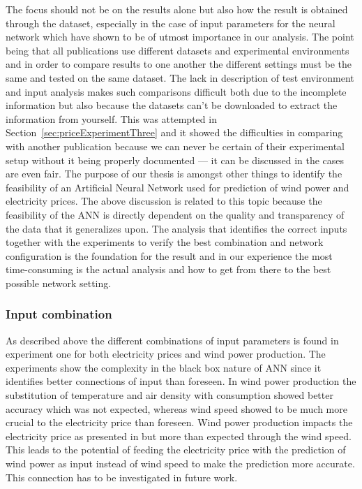 The focus should not be on the results alone but also how the result is obtained through the dataset, especially in the case of input parameters for the neural network which have shown to be of utmost importance in our analysis. The point being that all publications use different datasets and experimental environments and in order to compare results to one another the different settings must be the same and tested on the same dataset. The lack in description of test environment and input analysis makes such comparisons difficult both due to the incomplete information but also because the datasets can't be downloaded to extract the information from yourself. This was attempted in Section~\ref{sec:priceExperimentThree} and it showed the difficulties in comparing with another publication because we can never be certain of their experimental setup without it being properly documented --- it can be discussed in the cases are even fair. The purpose of our thesis is amongst other things to identify the feasibility of an Artificial Neural Network used for prediction of wind power and electricity prices. The above discussion is related to this topic because the feasibility of the ANN is directly dependent on the quality and transparency of the data that it generalizes upon. The analysis that identifies the correct inputs together with the experiments to verify the best combination and network configuration is the foundation for the result and in our experience the most time-consuming is the actual analysis and how to get from there to the best possible network setting.

\subsubsection{Input combination}
As described above the different combinations of input parameters is found in experiment one for both electricity prices and wind power production. The experiments show the complexity in the black box nature of ANN since it identifies better connections of input than foreseen. In wind power production the substitution of temperature and air density with consumption showed better accuracy which was not expected, whereas wind speed showed to be much more crucial to the electricity price than foreseen. Wind power production impacts the electricity price as presented in \cite{dayAheadImpactOfWindPowerForecasts} but more than expected through the wind speed. This leads to the potential of feeding the electricity price with the prediction of wind power as input instead of wind speed to make the prediction more accurate. This connection has to be investigated in future work.


